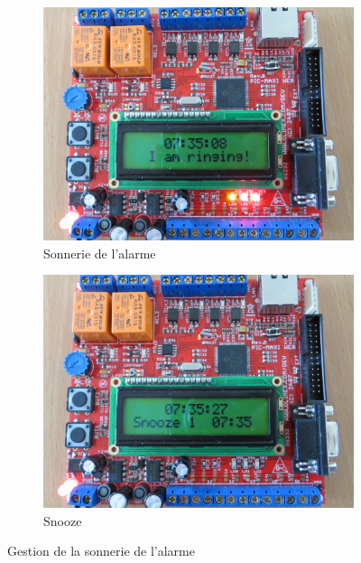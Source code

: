 \documentclass[12pt,a4paper]{article}
\begin{document}
\begin{figure}[!h]
        \centering
        \begin{subfigure}[b]{0.48\textwidth}
                \includegraphics[width=\textwidth]{photos/IMG_2160.JPG}
                \caption{Sonnerie de l'alarme}
                \label{fig:sonneriealarme}
        \end{subfigure}
        \begin{subfigure}[b]{0.48\textwidth}
                \includegraphics[width=\textwidth]{photos/IMG_2162.JPG}
                \caption{Snooze}
                \label{fig:snoozealarme}
        \end{subfigure}
        \caption{Gestion de la sonnerie de l'alarme}
        \label{fig:sonneriealarme}
\end{figure}
\end{document}

